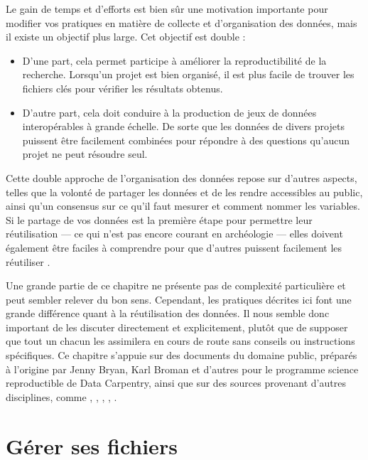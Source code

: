 \documentclass[
  french,
]{scrbook}
\providecommand{\tightlist}{%
  \setlength{\itemsep}{0pt}\setlength{\parskip}{0pt}}
\begin{document}
Le gain de temps et d'efforts est bien sûr une motivation importante pour modifier vos pratiques en matière de collecte et d'organisation des données, mais il existe un objectif plus large. Cet objectif est double :

\begin{itemize}
\tightlist
\item
  D'une part, cela permet participe à améliorer la reproductibilité de la recherche. Lorsqu'un projet est bien organisé, il est plus facile de trouver les fichiers clés pour vérifier les résultats obtenus.
\item
  D'autre part, cela doit conduire à la production de jeux de données interopérables à grande échelle. De sorte que les données de divers projets puissent être facilement combinées pour répondre à des questions qu'aucun projet ne peut résoudre seul.
\end{itemize}

Cette double approche de l'organisation des données repose sur d'autres aspects, telles que la volonté de partager les données et de les rendre accessibles au public, ainsi qu'un consensus sur ce qu'il faut mesurer et comment nommer les variables. Si le partage de vos données est la première étape pour permettre leur réutilisation --- ce qui n'est pas encore courant en archéologie --- elles doivent également être faciles à comprendre pour que d'autres puissent facilement les réutiliser \autocite{white2013}.

Une grande partie de ce chapitre ne présente pas de complexité particulière et peut sembler relever du bon sens. Cependant, les pratiques décrites ici font une grande différence quant à la réutilisation des données. Il nous semble donc important de les discuter directement et explicitement, plutôt que de supposer que tout un chacun les assimilera en cours de route sans conseils ou instructions spécifiques. Ce chapitre s'appuie sur des documents du domaine public, préparés à l'origine par Jenny Bryan, Karl Broman et d'autres pour le programme science reproductible de Data Carpentry, ainsi que sur des sources provenant d'autres disciplines, comme \textcite{borer2009}, \textcite{sutter2015}, \textcite{volk2014}, \textcite{hampton2013}, \textcite{strasser2012}.

\hypertarget{guxe9rer-ses-fichiers}{%
\chapter{Gérer ses fichiers}\label{guxe9rer-ses-fichiers}}
\end{document}
